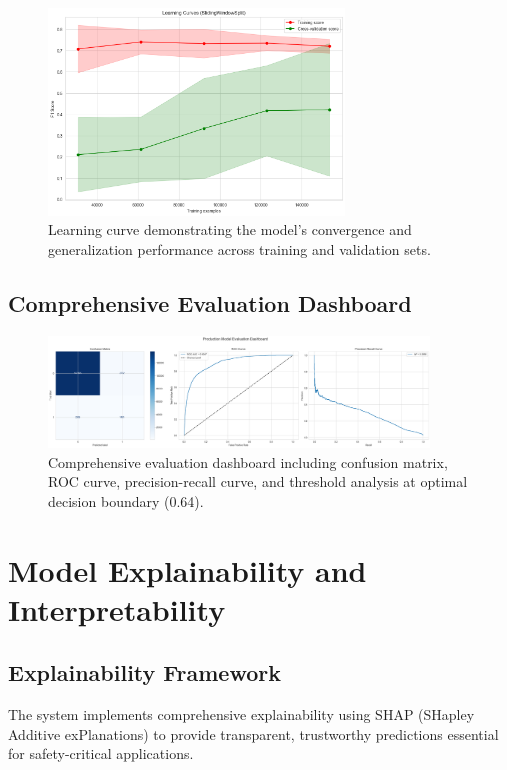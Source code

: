 \documentclass[11pt]{article}
\begin{document}
\begin{figure}[H]
\centering
\includegraphics[width=0.7\textwidth]{LogisticRegression_learning_curve.png}
\caption{Learning curve demonstrating the model's convergence and generalization performance across training and validation sets.}
\label{fig:learning_curve}
\end{figure}

\subsection{Comprehensive Evaluation Dashboard}

\begin{figure}[H]
\centering
\includegraphics[width=0.9\textwidth]{LogisticRegression_evaluation_dashboard.png}
\caption{Comprehensive evaluation dashboard including confusion matrix, ROC curve, precision-recall curve, and threshold analysis at optimal decision boundary (0.64).}
\label{fig:eval_dashboard}
\end{figure}

\section{Model Explainability and Interpretability}

\subsection{Explainability Framework}
The system implements comprehensive explainability using SHAP (SHapley Additive exPlanations) to provide transparent, trustworthy predictions essential for safety-critical applications.
\end{document}
